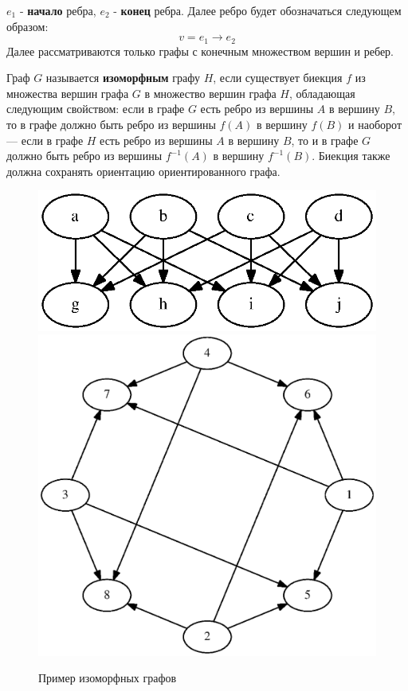 \documentclass[russian,utf8,emptystyle]{eskdtext}
\begin{document}
$e_1$ - \textbf{начало} ребра, $e_2$ - \textbf{конец} ребра. Далее ребро будет обозначаться следующем образом:
$$
v = e_1 \rightarrow e_2
$$
Далее рассматриваются только графы с конечным множеством вершин и ребер.

Граф $G$ называется \textbf{изоморфным} графу $H$, если существует биекция $f$ из множества вершин графа $G$ в множество вершин графа $H$, обладающая следующим свойством: если в графе $G$ есть ребро из вершины $A$ в вершину $B$, то в графе должно быть ребро из вершины $f(A)$ в вершину $f(B)$ и наоборот --- если в графе $H$ есть ребро из вершины $A$ в вершину $B$, то и в графе $G$ должно быть ребро из вершины $f^{-1}(A)$ в вершину $f^{-1}(B)$. Биекция также должна сохранять ориентацию ориентированного графа.

\begin{figure}[h!]
\centering
\includegraphics[scale=0.6]{graphs_isomorph_example_1}
\includegraphics[scale=0.6]{graphs_isomorph_example_2}
\caption{Пример изоморфных графов}
\end{figure}
\end{document}
